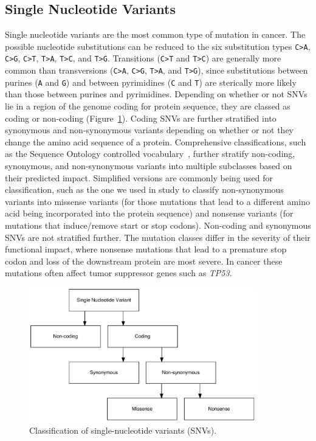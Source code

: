 \documentclass[11pt]{book}
\begin{document}
\subsection{Single Nucleotide Variants}

Single nucleotide variants are the most common type of mutation in cancer. The possible nucleotide substitutions can be reduced to the six substitution types \verb|C>A|, \verb|C>G|, \verb|C>T|, \verb|T>A|, \verb|T>C|, and \verb|T>G|. Transitions (\verb|C>T| and \verb|T>C|) are generally more common than transversions (\verb|C>A|, \verb|C>G|, \verb|T>A|, and \verb|T>G|), since substitutions between purines (\verb|A| and \verb|G|) and between pyrimidines (\verb|C| and \verb|T|) are sterically more likely than those between purines and pyrimidines. Depending on whether or not SNVs lie in a region of the genome coding for protein sequence, they are classed as coding or non-coding (Figure~\ref{fig:snv-classification}). Coding SNVs are further stratified into synonymous and non-synonymous variants depending on whether or not they change the amino acid sequence of a protein. Comprehensive classifications, such as the Sequence Ontology controlled vocabulary~\cite{Eilbeck:2005}, further stratify non-coding, synonymous, and non-synonymous variants into multiple subclasses based on their predicted impact. Simplified versions are commonly being used for classification, such as the one we used in study \IV to classify non-synonymous variants into missense variants (for those mutations that lead to a different amino acid being incorporated into the protein sequence) and nonsense variants (for mutations that induce/remove start or stop codons). Non-coding and synonymous SNVs are not stratified further. The mutation classes differ in the severity of their functional impact, where nonsense mutations that lead to a premature stop codon and loss of the downstream protein are most severe. In cancer these mutations often affect tumor suppressor genes such as \textit{TP53}.

\begin{figure}[t]
\centering
\includegraphics[width=280pt]{img/snv_classification.pdf}
\caption[SNV Classification]{Classification of single-nucleotide variants (SNVs).}
\label{fig:snv-classification}
\end{figure}
\end{document}

